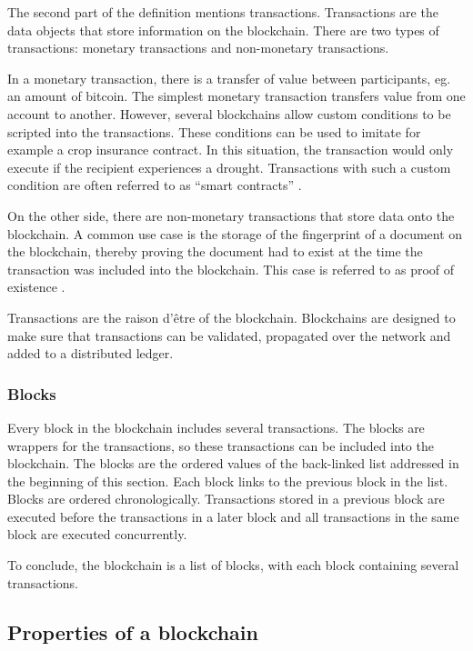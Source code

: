 The second part of the definition mentions transactions. Transactions are the data objects that store information on the blockchain. There are two types of transactions: monetary transactions and non-monetary transactions.

In a monetary transaction, there is a transfer of value between participants, eg. an amount of bitcoin. The simplest monetary transaction transfers value from one account to another. However, several blockchains allow custom conditions to be scripted into the transactions. These conditions can be used to imitate for example a crop insurance contract. In this situation, the transaction would only execute if the recipient experiences a drought. Transactions with such a custom condition are often referred to as ``smart contracts'' \cite{ethereum-whitepaper}.

On the other side, there are non-monetary transactions that store data onto the blockchain. A common use case is the storage of the fingerprint of a document on the blockchain, thereby proving the document had to exist at the time the transaction was included into the blockchain. This case is referred to as proof of existence \cite{proof-of-existence}.

Transactions are the raison d'\^{e}tre of the blockchain. Blockchains are designed to make sure that transactions can be validated, propagated over the network and added to a distributed ledger.

\subsubsection{Blocks}

Every block in the blockchain includes several transactions. The blocks are wrappers for the transactions, so these transactions can be included into the blockchain. The blocks are the ordered values of the back-linked list addressed in the beginning of this section. Each block links to the previous block in the list. Blocks are ordered chronologically. Transactions stored in a previous block are executed before the transactions in a later block and all transactions in the same block are executed concurrently.

To conclude, the blockchain is a list of blocks, with each block containing several transactions.

\subsection{Properties of a blockchain}

